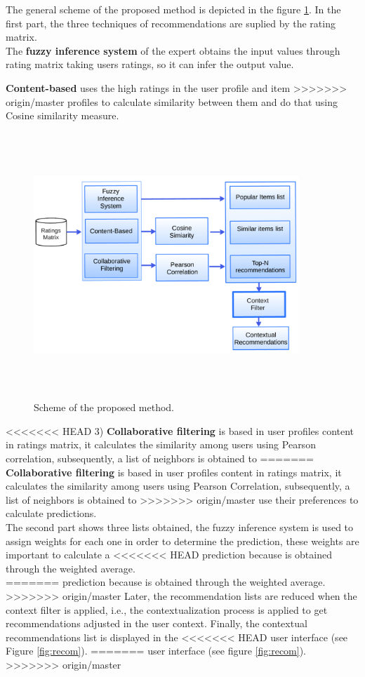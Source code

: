 The general scheme of the proposed method is depicted in the figure
\ref{fig:archit}. In the first part, the three techniques of
recommendations are suplied by the rating matrix. \\ The \textbf{fuzzy
inference system} of the expert  obtains the input values  through
rating matrix taking users ratings, so it can infer the output value.

\textbf{Content-based} uses the high ratings in the user profile and item
>>>>>>> origin/master
profiles to calculate similarity between them and do that using Cosine
similarity measure.
\begin{figure}
\captionsetup{font=footnotesize}
\centering 
\includegraphics[width=10cm,height=10cm,keepaspectratio]{img/archit.png}
\caption{Scheme of the proposed method.}
\label{fig:archit}  
\end{figure}
<<<<<<< HEAD
3) \textbf{Collaborative filtering} is based in user profiles content in
ratings matrix, it calculates the similarity among  users using
Pearson correlation, subsequently,  a list of neighbors is obtained to
=======
\textbf{Collaborative filtering} is based in user profiles content in
ratings matrix, it calculates the similarity among  users using
Pearson Correlation, subsequently,  a list of neighbors is obtained to
>>>>>>> origin/master
use their preferences to calculate predictions.\\
The second part shows three lists obtained, the fuzzy inference system
is used to assign weights for each one in order to determine the
prediction, these weights are important to calculate a
<<<<<<< HEAD
prediction because is obtained through the weighted average.\\
=======
prediction because is obtained through the weighted average.
>>>>>>> origin/master
Later, the recommendation lists are reduced when the context filter is
applied, i.e., the contextualization process is applied to get
recommendations adjusted in the user context. 
Finally, the contextual recommendations list is displayed in the 
<<<<<<< HEAD
user interface (see Figure  \ref{fig:recom}).
=======
user interface (see figure \ref{fig:recom}).
>>>>>>> origin/master

